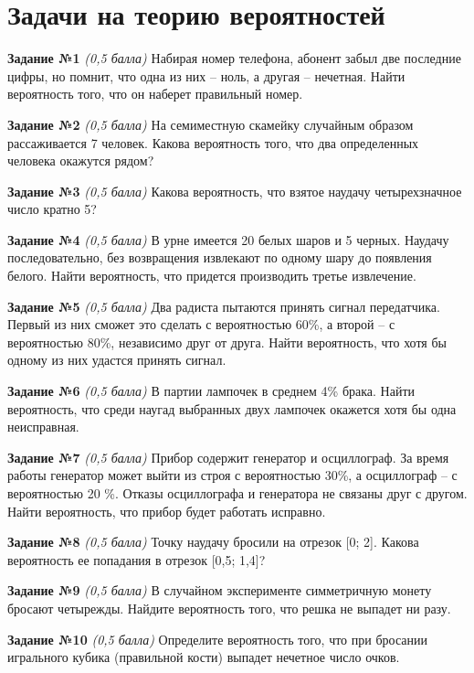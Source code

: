 \documentclass[12pt, a4paper]{article}
\begin{document}
		

\section*{Задачи на теорию вероятностей}
\textbf{Задание №1} \textit{(0,5 балла)} Набирая номер телефона, абонент забыл две последние цифры, но
помнит, что одна из них – ноль, а другая – нечетная. Найти вероятность того,
что он наберет правильный номер.

\textbf{Задание №2} \textit{(0,5 балла)} На семиместную скамейку случайным образом рассаживается 7 человек. Какова вероятность того, что два определенных человека окажутся рядом?

\textbf{Задание №3} \textit{(0,5 балла)} Какова вероятность, что взятое наудачу четырехзначное число кратно 5?

\textbf{Задание №4} \textit{(0,5 балла)} В урне имеется 20 белых шаров и 5 черных. Наудачу последовательно, без возвращения извлекают по одному шару до появления белого. Найти
вероятность, что придется производить третье извлечение.

\textbf{Задание №5} \textit{(0,5 балла)} Два радиста пытаются принять сигнал передатчика. Первый из них
сможет это сделать с вероятностью 60\%, а второй – с вероятностью 80\%, независимо друг от друга. Найти вероятность, что хотя бы одному из них удастся
принять сигнал.

\textbf{Задание №6} \textit{(0,5 балла)} В партии лампочек в среднем 4\% брака. Найти вероятность, что среди наугад выбранных двух лампочек окажется хотя бы одна неисправная.

\textbf{Задание №7} \textit{(0,5 балла)} Прибор содержит генератор и осциллограф. За время работы генератор может выйти из строя с вероятностью 30\%, а осциллограф – с вероятностью 20 \%. Отказы осциллографа и генератора не связаны друг с другом. Найти
вероятность, что прибор будет работать исправно.

\textbf{Задание №8} \textit{(0,5 балла)} Точку наудачу бросили на отрезок [0; 2]. Какова вероятность ее попадания в отрезок [0,5; 1,4]?

\textbf{Задание №9} \textit{(0,5 балла)} В случайном эксперименте симметричную монету бросают четырежды. Найдите вероятность того, что решка не выпадет ни разу.

\textbf{Задание №10} \textit{(0,5 балла)} Определите вероятность того, что при бросании игрального кубика (правильной кости) выпадет нечетное число очков.
\end{document}
